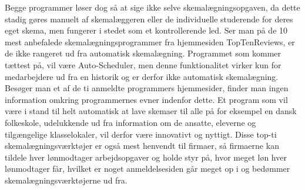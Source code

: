 Begge programmer løser dog så at sige ikke selve skemalægningsopgaven, da dette stadig gøres manuelt af skemalæggeren eller de individuelle studerende for deres eget skema, men fungerer i stedet som et kontrollerende led. Ser man på de 10 mest anbefalede skemalægningsprogrammer fra hjemmesiden TopTenReviews\cite{top10Schedulers}, er de ikke rangeret ud fra automatisk skemalægning. Programmet som kommer tættest på, vil være Auto-Scheduler, men denne funktionalitet virker kun for medarbejdere ud fra en historik og er derfor ikke automatisk skemalægning. Besøger man et af de ti anmeldte programmers hjemmesider, finder man ingen information omkring programmernes evner indenfor dette. Et program som vil være i stand til helt automatisk at lave skemaer til alle på for eksempel en dansk folkeskole, udelukkende ud fra information om de ansatte, eleverne og tilgængelige klasselokaler, vil derfor være innovativt og nyttigt. Disse top-ti skemalægningsværktøjer er også mest henvendt til firmaer, så firmaerne kan tildele hver lønmodtager arbejdsopgaver og holde styr på, hvor meget løn hver lønmodtager får, hvilket er noget anmeldelsesiden går meget op i og bedømmer skemalægningsværktøjerne ud fra.


